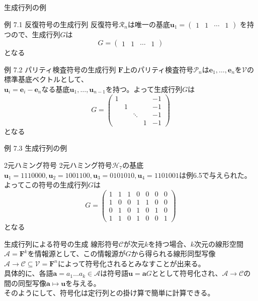 \documentclass[dvipdfmx,10pt,jsarticle]{beamer}
\begin{document}
  \begin{frame}{生成行列の例}
    \begin{block}{例 7.1 反復符号の生成行列}
      反復符号$\mathcal{R}_n$は唯一の基底$\mathbf{u}_1 = \begin{pmatrix} 1 & 1 & \cdots & 1 \end{pmatrix}$ を持つので、生成行列$G$は
      \[G = \begin{pmatrix}
          1 & 1 & \cdots & 1
      \end{pmatrix} \]
      となる
    \end{block}
    \begin{block}{例 7.2 パリティ検査符号の生成行列}
      $\mathbf{F}$上のパリティ検査符号$\mathcal{P}_n$は$\mathbf{e}_1, \ldots, \mathbf{e}_n$を$\mathcal{V}$の標準基底ベクトルとして、\\
      $\mathbf{u}_i = \mathbf{e}_i - \mathbf{e}_n$なる基底$\mathbf{u}_1 ,\ldots,\mathbf{u}_{n-1}$を持つ。よって生成行列$G$は
      \[G = \begin{pmatrix}
          1 &   &   &  & -1 \\
            & 1 &   &  & -1 \\
            &   & \ddots &  & -1 \\
            &   &   & 1 & -1
      \end{pmatrix} \]
      となる
    \end{block}
  \end{frame}
  \begin{frame}{例 7.3 生成行列の例}
    \begin{block}{2元ハミング符号}
      2元ハミング符号$\mathcal{H}_7$の基底$\mathbf{u}_1 = 1110000, \mathbf{u}_2 = 1001100, \mathbf{u}_3 = 0101010, \mathbf{u}_4 = 1101001$は例6.5で与えられた。\\
      よってこの符号の生成行列$G$は
      \[ G = \begin{pmatrix}
          1 & 1 & 1 & 0 & 0 & 0 & 0 \\
          1 & 0 & 0 & 1 & 1 & 0 & 0 \\
          0 & 1 & 0 & 1 & 0 & 1 & 0 \\
          1 & 1 & 0 & 1 & 0 & 0 & 1
      \end{pmatrix} \] となる
    \end{block}
  \end{frame}

  \begin{frame}{生成行列による符号の生成}
    線形符号$\mathcal{C}$が次元$k$を持つ場合、$k$次元の線形空間$\mathcal{A} = \mathbf{F}^k$を情報源として、この情報源が$G$から得られる線形同型写像$\mathcal{A} \rightarrow \mathcal{C} \subseteq \mathcal{V} = \mathbf{F}^n$によって符号化されるとみなすことが出来る。 \\
    具体的に、各語$\mathbf{a} = a_1 \dots a_k \in \mathcal{A}$は符号語$\mathbf{u} = \mathbf{a} G$ととして符号化され、$\mathcal{A} \rightarrow \mathcal{C}$の間の同型写像$\mathbf{a} \mapsto \mathbf{u}$を与える。\\
    そのようにして、符号化は定行列との掛け算で簡単に計算できる。
  \end{frame}
\end{document}
